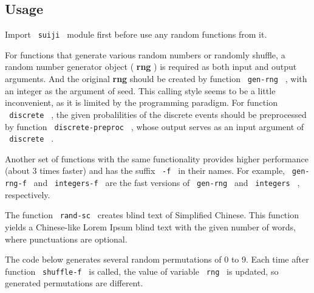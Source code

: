 \subsection{Usage}\label{usage}

Import \texttt{\ suiji\ } module first before use any random functions
from it.

\begin{Shaded}
\begin{Highlighting}[]
\end{Highlighting}
\end{Shaded}

For functions that generate various random numbers or randomly shuffle,
a random number generator object ( \textbf{rng} ) is required as both
input and output arguments. And the original \textbf{rng} should be
created by function \texttt{\ gen-rng\ } , with an integer as the
argument of seed. This calling style seems to be a little inconvenient,
as it is limited by the programming paradigm. For function
\texttt{\ discrete\ } , the given probalilities of the discrete events
should be preprocessed by function \texttt{\ discrete-preproc\ } , whose
output serves as an input argument of \texttt{\ discrete\ } .

Another set of functions with the same functionality provides higher
performance (about 3 times faster) and has the suffix \texttt{\ -f\ } in
their names. For example, \texttt{\ gen-rng-f\ } and
\texttt{\ integers-f\ } are the fast versions of \texttt{\ gen-rng\ }
and \texttt{\ integers\ } , respectively.

The function \texttt{\ rand-sc\ } creates blind text of Simplified
Chinese. This function yields a Chinese-like Lorem Ipsum blind text with
the given number of words, where punctuations are optional.

The code below generates several random permutations of 0 to 9. Each
time after function \texttt{\ shuffle-f\ } is called, the value of
variable \texttt{\ rng\ } is updated, so generated permutations are
different.

\begin{Shaded}
\begin{Highlighting}[]
\NormalTok{\#\{}
\NormalTok{    [\#(a.map(it =\textgreater{} str(it)).join("  ")) \textbackslash{} ]}
\NormalTok{  \}}
\NormalTok{\}}
\end{Highlighting}
\end{Shaded}

